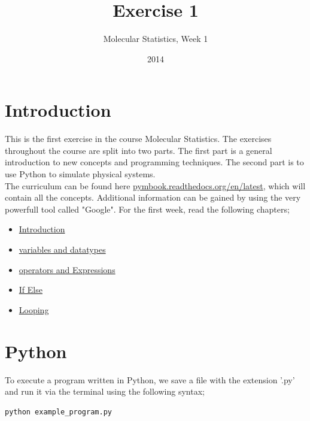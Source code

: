 \documentclass{article}
\title{Exercise 1}
\author{Molecular Statistics, Week 1}
\date{2014}
\begin{document}

\maketitle

\section{Introduction}

This is the first exercise in the course Molecular Statistics. The exercises
throughout the course are split into two parts. The first part is a general
introduction to new concepts and programming techniques. The second part is to use
Python to simulate physical systems.\\

The curriculum can be found here 
\href{http://pymbook.readthedocs.org/en/latest/}{pymbook.readthedocs.org/en/latest},
which will contain all the concepts.
Additional information can be gained by using the very powerfull tool called "Google".
For the first week, read the following chapters;

\begin{itemize}
    \item \href{http://pymbook.readthedocs.org/en/latest/thebeginning.html}{Introduction}
    \item \href{http://pymbook.readthedocs.org/en/latest/variablesanddatatypes.html}{variables and datatypes}
    \item \href{http://pymbook.readthedocs.org/en/latest/operatorsexpressions.html}{operators and Expressions}
    \item \href{http://pymbook.readthedocs.org/en/latest/ifelse.html}{If Else}
    \item \href{http://pymbook.readthedocs.org/en/latest/looping.html}{Looping}
\end{itemize}


\section{Python}

To execute a program written in Python, we save a file with the extension
'.py' and run it via the terminal using the following syntax;

\begin{lstlisting}
python example_program.py
\end{lstlisting}
\end{document}
